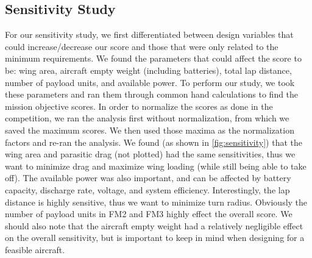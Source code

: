 \subsection{Sensitivity Study}
\label{ssec:SensitivityStudy}


For our sensitivity study, we first differentiated between design variables that could increase/decrease our score and those that were only related to the minimum requirements. We found the parameters that could affect the score to be: wing area, aircraft empty weight (including batteries), total lap distance, number of payload units, and available power.  To perform our study, we took these parameters and ran them through common hand calculations to find the mission objective scores. In order to normalize the scores as done in the competition, we ran the analysis first without normalization, from which we saved the maximum scores. We then used those maxima as the normalization factors and re-ran the analysis. We found (as shown in \cref{fig:sensitivity}) that the wing area and parasitic drag (not plotted) had the same sensitivities, thus we want to minimize drag and maximize wing loading (while still being able to take off).  The available power was also important, and can be affected by battery capacity, discharge rate, voltage, and system efficiency. Interestingly, the lap distance is highly sensitive, thus we want to minimize turn radius. Obviously the number of payload units in FM2 and FM3 highly effect the overall score.  We should also note that the aircraft empty weight had a relatively negligible effect on the overall sensitivity, but is important to keep in mind when designing for a feasible aircraft.